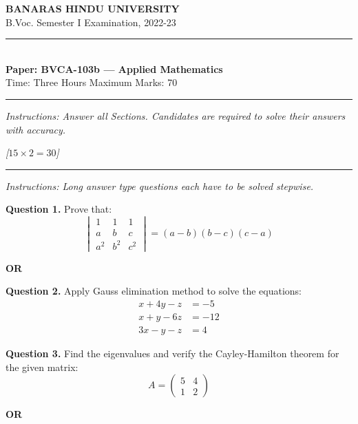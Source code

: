 \documentclass[11pt,a4paper]{article}
\newcommand{\pts}[1]{\hfill   \textit{[#1]}}
\begin{document}
\begin{center}
  {\large\bfseries BANARAS HINDU UNIVERSITY}\\[2pt]
  {
\normalsize B.Voc. Semester I Examination, 2022-23}\\[6pt]
  \rule{0.8\linewidth}{0.5pt}\\[6pt]
  {\large\bfseries Paper: BVCA-103b --- Applied Mathematics}\\[4pt]
  {
\normalsize Time: Three Hours \hfill Maximum Marks: 70}
\end{center}

\rule{\linewidth}{0.4pt}

\smallskip



\noindent   \textit{Instructions: Answer all Sections. Candidates are required to solve their answers with accuracy.}

\bigskip

\bigskip


\pts{$15  \times 2 = 30$}
\rule{\linewidth}{0.4pt}\smallskip




\noindent   \textit{Instructions: Long answer type questions each have to be solved stepwise.}

\medskip


\noindent   \textbf{Question 1.} Prove that:
\[

\begin{vmatrix}
  1 & 1 & 1 \\
  a & b & c \\
  a^2 & b^2 & c^2
\end{vmatrix} = (a-b)(b-c)(c-a)
\]
\centerline{   \textbf{OR}}

\medskip


\noindent   \textbf{Question 2.} Apply Gauss elimination method to solve the equations:
\[

\begin{aligned}
  x + 4y - z &= -5 \\
  x + y - 6z &= -12 \\
  3x - y - z &= 4
\end{aligned}
\]

\medskip


\noindent   \textbf{Question 3.} Find the eigenvalues and verify the Cayley-Hamilton theorem for the given matrix:
\[
A = 
\begin{pmatrix}
  5 & 4 \\
  1 & 2
\end{pmatrix}
\]
\centerline{   \textbf{OR}}
\end{document}
